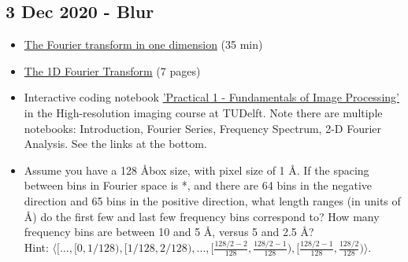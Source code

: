\documentclass[11pt, oneside]{article}   	%
\begin{document}
\pagebreak
\subsection{3 Dec 2020 - Blur}
\begin{itemize}
	\item \href{https://youtu.be/27bNryOu84g}{The Fourier transform in one dimension} (35 min)
	\item \href{https://cryoemprinciples.yale.edu/sites/default/files/files/3%20Fourier1D.pdf}{The 1D Fourier Transform} (7 pages)
	\item Interactive coding notebook \href{https://gitlab.tudelft.nl/aj-lab/teaching/-/wikis/NB4020}{'Practical 1 - Fundamentals of Image Processing'} in the High-resolution imaging course at TUDelft. Note there are multiple notebooks: Introduction, Fourier Series, Frequency Spectrum, 2-D Fourier Analysis. See the links at the bottom.
\end{itemize}
\begin{itemize}
	\item Assume you have a 128 \AA box size, with pixel size of 1 \AA. If the spacing between bins in Fourier space is *, and there are 64 bins in the negative direction and 65 bins in the positive direction, what length ranges (in units of \AA) do the first few and last few frequency bins correspond to?  How many frequency bins are between 10 and 5 \AA, versus 5 and 2.5 \AA? \\ Hint: $\langle[..., [0,1/128), [1/128,2/128), ... , [\frac{128/2-2}{128}, \frac{128/2-1}{128}),  [\frac{128/2-1}{128}, \frac{128/2}{128})\rangle$.
\end{itemize}
\end{document}
